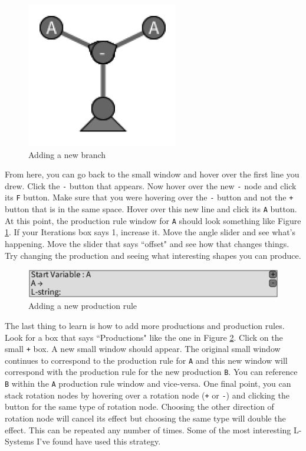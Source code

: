 \documentclass[12pt,twoside]{reedthesis}
\newcommand{\code}[1]{\texttt{#1}}
\begin{document}
	\begin{figure}[h]
	\centering
	\includegraphics[height = 2.5in]{Images/HowToExplore3}
	\caption{Adding a new branch}
	\label{branching}
	\end{figure}
	
	From here, you can go back to the small window and hover over the first line you drew. Click the \code{-} button that appears. Now hover over the new \code{-} node and click its \code{F} button. Make sure that you were hovering over the \code{-} button and not the \code{+} button that is in the same space. Hover over this new line and click its \code{A} button. At this point, the production rule window for \code{A} should look something like Figure \ref{branching}. If your Iterations box says 1, increase it. Move the angle slider and see what's happening. Move the slider that says ``offset" and see how that changes things. Try changing the production and seeing what interesting shapes you can produce.\\
	
	\begin{figure}[h]
	\centering
	\includegraphics[width=\textwidth]{Images/HowToExplore4}
	\caption{Adding a new production rule}
	\label{newProductions}
	\end{figure}
	
	The last thing to learn is how to add more productions and production rules. Look for a box that says ``Productions" like the one in Figure \ref{newProductions}. Click on the small \code{+} box. A new small window should appear. The original small window continues to correspond to the production rule for \code{A} and this new window will correspond with the production rule for the new production \code{B}. You can reference \code{B} within the \code{A} production rule window and vice-versa. One final point, you can stack rotation nodes by hovering over a rotation node (\code{+} or \code{-}) and clicking the button for the same type of rotation node. Choosing the other direction of rotation node will cancel its effect but choosing the same type will double the effect. This can be repeated any number of times. Some of the most interesting L-Systems I've found have used this strategy.
	
\end{document}
